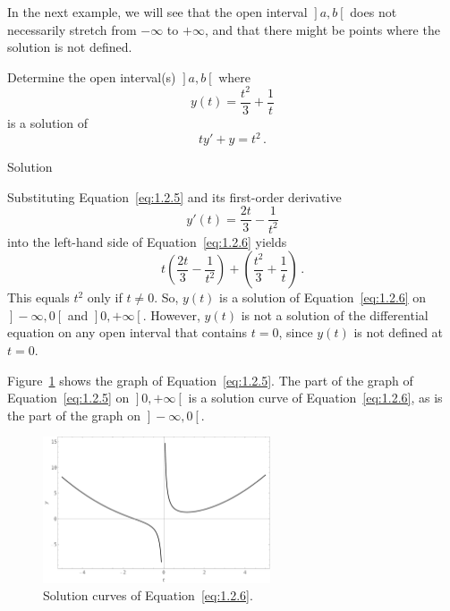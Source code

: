 In the next example, we will see that the open interval $\left.\right]a,b\left[\right.$ does not necessarily stretch from $-\infty$ to $+\infty$, and that there might be points where the solution is not defined. 

\begin{example}\label{example:1.2.2} 
Determine the open interval(s) $\left.\right]a,b\left[\right.$ where 
\begin{equation} \label{eq:1.2.5}
y(t)=\dfrac{t^2}{3}+\dfrac{1}{t}
\end{equation}
is a solution of
\begin{equation} \label{eq:1.2.6}
ty'+y=t^2\,.
\end{equation}

Solution 

Substituting Equation~\eqref{eq:1.2.5} and its first-order derivative
$$
y'(t)=\dfrac{2t}{3} - \dfrac{1}{t^2}
$$
into the left-hand side of Equation~\eqref{eq:1.2.6} yields
$$
t \left(\dfrac{2t}{3} - \dfrac{1}{t^2}\right)+
\left(\dfrac{t^2}{3}+\dfrac{1}{t}\right)\,.
$$
This equals $t^2$ only if $t\ne0$. So, $y(t)$ is a solution of Equation~\eqref{eq:1.2.6} on $\left.\right]-\infty,0\left[\right.$ and $\left.\right]0,+\infty\left[\right.$.  However, $y(t)$ is not a solution of the differential equation on any open interval that contains $t=0$, since  $y(t)$ is not defined at  $t=0$.

Figure~\ref{Example2} shows the graph of Equation~\eqref{eq:1.2.5}. The part of the graph of Equation~\eqref{eq:1.2.5} on $\left.\right]0,+\infty\left[\right.$ is a solution curve of Equation~\eqref{eq:1.2.6}, as is the part of the graph on $\left.\right]-\infty,0\left[\right.$.

\begin{figure}[H]
	\begin{center}
			\includegraphics[width=0.6\textwidth]{Example_2.pdf}
	\caption{Solution curves of Equation~\eqref{eq:1.2.6}.}
	\label{Example2}
	\end{center}
\end{figure}

\end{example}



